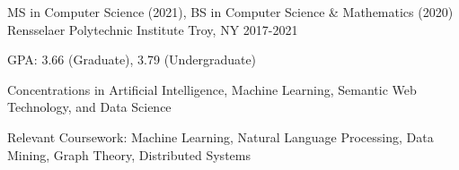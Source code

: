 


\begin{cventries}

  \cventry
  {MS in Computer Science (2021), BS in Computer Science \& Mathematics (2020)}
	{Rensselaer Polytechnic Institute}
	{Troy, NY}
	{2017-2021}
  {
    \begin{cvitems}
      \item GPA: 3.66 (Graduate), 3.79 (Undergraduate)
      \item Concentrations in Artificial Intelligence, Machine Learning, Semantic Web Technology, and Data Science
      \item Relevant Coursework: Machine Learning, Natural Language Processing, Data Mining, Graph Theory, Distributed Systems
    \end{cvitems}
  }


\end{cventries}